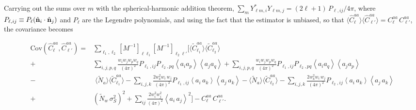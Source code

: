 \documentclass[aps,twocolumn, superscriptaddress, english, nofootinbib, 10pt]{revtex4-2}
\newcommand{\nv}{\hat{\bf n}}
\begin{document}
Carrying out the sums over $m$ with the spherical-harmonic addition theorem, $\sum_m Y_{\ell m, i}^* Y_{\ell m, j} = (2\ell + 1)\,P_{\ell, ij}/4\pi$, where $P_{\ell, ij} \equiv P_\ell(\nv_i \cdot \nv_j)$ and $P_\ell$ are the Legendre polynomials, and using the fact that the estimator is unbiased, so that $\langle \hat{C}_\ell^{aa}\rangle\langle \hat{C}_{\ell'}^{aa}\rangle = C_\ell^{aa}\,C_{\ell'}^{aa}$, the covariance becomes
\begin{widetext}
\begin{equation} \label{eq:cov_brute_long}
\begin{split}
    \mathrm{Cov}(\hat{C}_\ell^{aa}, \hat{C}_{\ell'}^{aa}) = & \sum_{\ell_1,\ell_2} [M^{-1}]_{\ell\ell_1} [M^{-1}]_{\ell_2\ell'} \Bigg[\langle \tilde{C}_{\ell_1}^{aa} \rangle \langle\tilde{C}_{\ell_2}^{aa} \rangle
 \\ + & \sum_{i,j, p, q}  \frac{w_i w_jw_p w_q}{(4\pi)^2} P_{\ell_1, ij}   P_{\ell_2, pq} \left\langle a_i a_p \right\rangle \left\langle a_j a_q \right\rangle 
+ \sum_{i,j, p, q}  \frac{w_i w_j w_p w_q}{(4\pi)^2} P_{\ell_1, ij} P_{\ell_2, pq}
  \left\langle a_i a_q \right\rangle \left\langle a_j a_p \right\rangle\\
-&\; \langle \tilde{N}_a \rangle \langle\tilde{C}_{\ell_1}^{aa} \rangle-  \sum_{i, j, k} \frac{2 w_k^2 w_i\,w_j}{(4\pi)^2} P_{\ell_1, ij}
 \left\langle a_i\,a_k\right\rangle \left\langle a_j\,a_k\right\rangle 
- \langle \tilde{N}_a \rangle \langle\tilde{C}_{\ell_2}^{aa} \rangle-  \sum_{i, j, k} \frac{2 w_k^2 w_i\,w_j}{(4\pi)^2} P_{\ell_2, ij}
 \left\langle a_i\,a_k\right\rangle \left\langle a_j\,a_k\right\rangle \\
+& \left(\tilde{N}_{w} \, \sigma_{S}^{2}\right)^2 +  \sum_{ij}  \frac{2 w_i^2 w_j^2 }{(4\pi)^2} \left\langle a_i\,a_j\right\rangle^{2} \Bigg]
- C_\ell^{aa}\,  C_{\ell'}^{aa}.
\end{split}
\end{equation}
\end{widetext}
 
\end{document}
